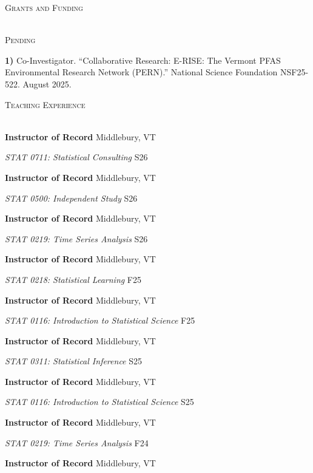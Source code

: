 \documentclass[a4paper]{article}
\newcommand{\lineunder} {
	\vspace*{-8pt} \\
	\hspace*{-18pt} \hrulefill \\
}
\newcommand{\header} [1] {
	{\hspace*{-18pt}\vspace*{6pt} \textcolor{Cerulean}{\textsc{#1}}}
	\vspace*{-6pt} \textcolor{Cerulean}{\lineunder}
}
\newcommand{\subheader} [1] {
	{\hspace*{-9pt}\vspace*{6pt} \textcolor{Cerulean}{\textsc{#1}}}
	\vspace*{-6pt}
}
\begin{document}
\header{Grants and Funding}
\vspace*{2mm}

\subheader{Pending}
\vspace*{2mm}

\textbf{1)} Co-Investigator. ``Collaborative Research: E-RISE: The
Vermont PFAS Environmental Research Network (PERN).'' National Science
Foundation NSF25-522. August 2025. \vspace*{2mm}

\header{Teaching Experience}
\vspace*{2mm}

\textbf{Instructor of Record} \hfill Middlebury, VT

\emph{STAT 0711: Statistical Consulting} \hfill S26 \vspace*{2mm}

\textbf{Instructor of Record} \hfill Middlebury, VT

\emph{STAT 0500: Independent Study} \hfill S26 \vspace*{2mm}

\textbf{Instructor of Record} \hfill Middlebury, VT

\emph{STAT 0219: Time Series Analysis} \hfill S26 \vspace*{2mm}

\textbf{Instructor of Record} \hfill Middlebury, VT

\emph{STAT 0218: Statistical Learning} \hfill F25 \vspace*{2mm}

\textbf{Instructor of Record} \hfill Middlebury, VT

\emph{STAT 0116: Introduction to Statistical Science} \hfill F25
\vspace*{2mm}

\textbf{Instructor of Record} \hfill Middlebury, VT

\emph{STAT 0311: Statistical Inference} \hfill S25 \vspace*{2mm}

\textbf{Instructor of Record} \hfill Middlebury, VT

\emph{STAT 0116: Introduction to Statistical Science} \hfill S25
\vspace*{2mm}

\textbf{Instructor of Record} \hfill Middlebury, VT

\emph{STAT 0219: Time Series Analysis} \hfill F24 \vspace*{2mm}

\textbf{Instructor of Record} \hfill Middlebury, VT
\end{document}
